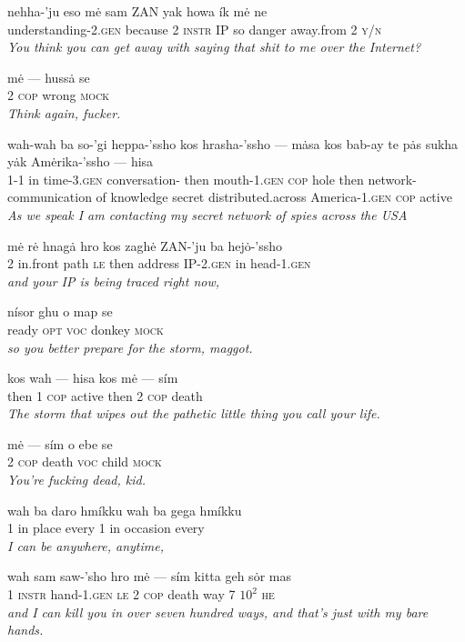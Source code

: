 \documentclass{article}[10pt]
\begin{document}
\begin{exe}
\ex
\gll nehha-'ju eso m\.{e} sam ZAN yak howa \'{i}k m\.{e} ne\\
understanding-\textsc{2.gen} because 2 \textsc{instr} IP so danger away.from 2 \textsc{y/n}\\
\trans \emph{You think you can get away with saying that shit to me over the Internet?}

\ex
\gll m\.{e} --- huss\.{a} se\\
2 \textsc{cop} wrong \textsc{mock}\\
\trans \emph{Think again, fucker.}

\ex
\gll wah-wah ba so-'gi heppa-'ssho kos hrasha-'ssho --- m\.{a}sa kos bab-ay te p\.{a}s sukha y\.{a}k Am\.{e}rika-'ssho --- hisa\\
1-1 in time-\textsc{3.gen} conversation- then mouth-\textsc{1.gen} \textsc{cop} hole then network-communication of knowledge secret distributed.across America-\textsc{1.gen} \textsc{cop} active\\
\trans \emph{As we speak I am contacting my secret network of spies across the USA}

\ex
\gll m\.{e} r\.{e} hnag\.{a} hro kos zagh\.{e} ZAN-'ju ba hej\.{o}-'ssho\\
2 in.front path \textsc{le} then address IP-\textsc{2.gen} in head-\textsc{1.gen}\\
\trans \emph{and your IP is being traced right now,}

\ex
\gll n\'{i}sor ghu o map se\\
ready \textsc{opt} \textsc{voc} donkey \textsc{mock}\\
\trans \emph{so you better prepare for the storm, maggot.}

\ex
\gll kos wah --- hisa kos m\.{e} --- s\'{i}m\\
then 1 \textsc{cop} active then 2 \textsc{cop} death\\
\trans \emph{The storm that wipes out the pathetic little thing you call your life.}

\ex
\gll m\.{e} --- s\'{i}m o ebe se\\
2 \textsc{cop} death \textsc{voc} child \textsc{mock}\\
\trans \emph{You're fucking dead, kid.}

\ex
\gll wah ba daro hm\'{i}kku wah ba gega hm\'{i}kku\\
1 in place every 1 in occasion every\\
\trans \emph{I can be anywhere, anytime,}

\ex
\gll wah sam saw-'sho hro m\.{e} --- s\'{i}m kitta geh s\.{o}r mas\\
1 \textsc{instr} hand-\textsc{1.gen} \textsc{le} 2 \textsc{cop} death way 7 $10^2$ \textsc{he}\\
\trans \emph{and I can kill you in over seven hundred ways, and that's just with my bare hands.}


\end{exe}
\end{document}
